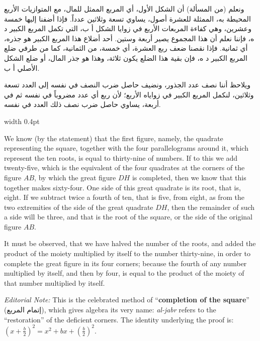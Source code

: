 \documentclass[11pt,a4paper]{book}
\newcommand{\cnote}[1]{\textcolor{notecolor}{\textit{#1}}}
\newcommand{\ar}[1]{{\arabicfont\beginR #1\endR}}
\begin{document}
\noindent\begin{minipage}[t]{0.48\textwidth}
\raggedleft

\begin{Arabic}
ونعلم (من المسألة) أن الشكل الأول، أي المربع الممثل للمال، مع المتوازيات الأربع المحيطة به، الممثلة للعشرة أصول، يساوي تسعة وثلاثين عدداً. فإذا أضفنا إليها خمسة وعشرين، وهي كفاءة المربعات الأربع في زوايا الشكل أ ب، التي تكمل المربع الكبير د ه، فإننا نعلم أن هذا المجموع يصير أربعة وستين. أحد أضلاع هذا المربع الكبير هو جذره، أي ثمانية. فإذا نقصنا ضعف ربع العشرة، أي خمسة، من الثمانية، كما من طرفي ضلع المربع الكبير د ه، فإن بقية هذا الضلع يكون ثلاثة، وهذا هو جذر المال، أو ضلع الشكل الأصلي أ ب.

ويلاحظ أننا نصف عدد الجذور، ونضيف حاصل ضرب النصف في نفسه إلى العدد تسعة وثلاثين، لنكمل المربع الكبير في زواياه الأربع؛ لأن ربع أي عدد مضروباً في نفسه ثم في أربعة، يساوي حاصل ضرب نصف ذلك العدد في نفسه.
\end{Arabic}

\end{minipage}%
\hfill\vrule width 0.4pt\hfill
\begin{minipage}[t]{0.48\textwidth}
\raggedright

We know (by the statement) that the first figure, namely, the quadrate representing the square, together with the four parallelograms around it, which represent the ten roots, is equal to thirty-nine of numbers. If to this we add twenty-five, which is the equivalent of the four quadrates at the corners of the figure $AB$, by which the great figure $DH$ is completed, then we know that this together makes sixty-four. One side of this great quadrate is its root, that is, eight. If we subtract twice a fourth of ten, that is five, from eight, as from the two extremities of the side of the great quadrate $DH$, then the remainder of such a side will be three, and that is the root of the square, or the side of the original figure $AB$.

\vspace{0.3cm}

It must be observed, that we have halved the number of the roots, and added the product of the moiety multiplied by itself to the number thirty-nine, in order to complete the great figure in its four corners; because the fourth of any number multiplied by itself, and then by four, is equal to the product of the moiety of that number multiplied by itself.

\cnote{Editorial Note:} This is the celebrated method of ``\textbf{completion of the square}'' (\ar{إتمام المربع}), which gives algebra its very name: \textit{al-jabr} refers to the ``restoration'' of the deficient corners. The identity underlying the proof is: $\left(x + \frac{b}{2}\right)^2 = x^2 + bx + \left(\frac{b}{2}\right)^2$.

\end{minipage}
\vspace{0.3cm}
\end{document}
